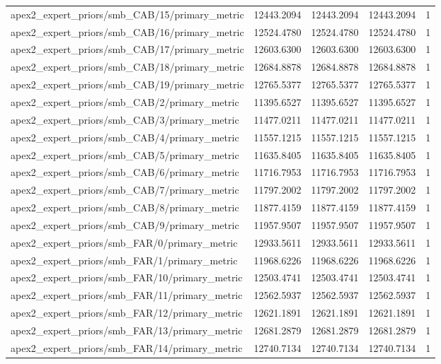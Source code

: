 \begin{table}[h]
\begin{tabular}{lrrrr}
apex2_expert_priors/smb_CAB/15/primary_metric & 12443.2094 & 12443.2094 & 12443.2094 & 1 \\
apex2_expert_priors/smb_CAB/16/primary_metric & 12524.4780 & 12524.4780 & 12524.4780 & 1 \\
apex2_expert_priors/smb_CAB/17/primary_metric & 12603.6300 & 12603.6300 & 12603.6300 & 1 \\
apex2_expert_priors/smb_CAB/18/primary_metric & 12684.8878 & 12684.8878 & 12684.8878 & 1 \\
apex2_expert_priors/smb_CAB/19/primary_metric & 12765.5377 & 12765.5377 & 12765.5377 & 1 \\
apex2_expert_priors/smb_CAB/2/primary_metric & 11395.6527 & 11395.6527 & 11395.6527 & 1 \\
apex2_expert_priors/smb_CAB/3/primary_metric & 11477.0211 & 11477.0211 & 11477.0211 & 1 \\
apex2_expert_priors/smb_CAB/4/primary_metric & 11557.1215 & 11557.1215 & 11557.1215 & 1 \\
apex2_expert_priors/smb_CAB/5/primary_metric & 11635.8405 & 11635.8405 & 11635.8405 & 1 \\
apex2_expert_priors/smb_CAB/6/primary_metric & 11716.7953 & 11716.7953 & 11716.7953 & 1 \\
apex2_expert_priors/smb_CAB/7/primary_metric & 11797.2002 & 11797.2002 & 11797.2002 & 1 \\
apex2_expert_priors/smb_CAB/8/primary_metric & 11877.4159 & 11877.4159 & 11877.4159 & 1 \\
apex2_expert_priors/smb_CAB/9/primary_metric & 11957.9507 & 11957.9507 & 11957.9507 & 1 \\
apex2_expert_priors/smb_FAR/0/primary_metric & 12933.5611 & 12933.5611 & 12933.5611 & 1 \\
apex2_expert_priors/smb_FAR/1/primary_metric & 11968.6226 & 11968.6226 & 11968.6226 & 1 \\
apex2_expert_priors/smb_FAR/10/primary_metric & 12503.4741 & 12503.4741 & 12503.4741 & 1 \\
apex2_expert_priors/smb_FAR/11/primary_metric & 12562.5937 & 12562.5937 & 12562.5937 & 1 \\
apex2_expert_priors/smb_FAR/12/primary_metric & 12621.1891 & 12621.1891 & 12621.1891 & 1 \\
apex2_expert_priors/smb_FAR/13/primary_metric & 12681.2879 & 12681.2879 & 12681.2879 & 1 \\
apex2_expert_priors/smb_FAR/14/primary_metric & 12740.7134 & 12740.7134 & 12740.7134 & 1 \\

\end{tabular}
\end{table}
